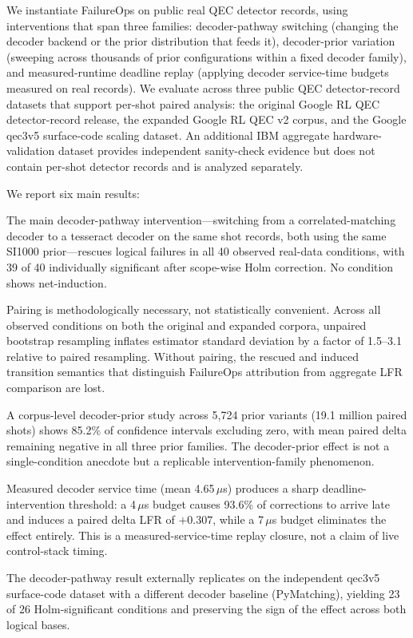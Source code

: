 We instantiate FailureOps on public real QEC detector records, using interventions that span three families: decoder-pathway switching (changing the decoder backend or the prior distribution that feeds it), decoder-prior variation (sweeping across thousands of prior configurations within a fixed decoder family), and measured-runtime deadline replay (applying decoder service-time budgets measured on real records). We evaluate across three public QEC detector-record datasets that support per-shot paired analysis: the original Google RL QEC detector-record release, the expanded Google RL QEC v2 corpus, and the Google qec3v5 surface-code scaling dataset. An additional IBM aggregate hardware-validation dataset provides independent sanity-check evidence but does not contain per-shot detector records and is analyzed separately.

We report six main results:

The main decoder-pathway intervention---switching from a correlated-matching decoder to a tesseract decoder on the same shot records, both using the same SI1000 prior---rescues logical failures in all 40 observed real-data conditions, with 39 of 40 individually significant after scope-wise Holm correction. No condition shows net-induction.

Pairing is methodologically necessary, not statistically convenient. Across all observed conditions on both the original and expanded corpora, unpaired bootstrap resampling inflates estimator standard deviation by a factor of 1.5--3.1 relative to paired resampling. Without pairing, the rescued and induced transition semantics that distinguish FailureOps attribution from aggregate LFR comparison are lost.

A corpus-level decoder-prior study across 5,724 prior variants (19.1 million paired shots) shows 85.2\% of confidence intervals excluding zero, with mean paired delta remaining negative in all three prior families. The decoder-prior effect is not a single-condition anecdote but a replicable intervention-family phenomenon.

Measured decoder service time (mean 4.65\,$\mu$s) produces a sharp deadline-intervention threshold: a 4\,$\mu$s budget causes 93.6\% of corrections to arrive late and induces a paired delta LFR of $+0.307$, while a 7\,$\mu$s budget eliminates the effect entirely. This is a measured-service-time replay closure, not a claim of live control-stack timing.

The decoder-pathway result externally replicates on the independent qec3v5 surface-code dataset with a different decoder baseline (PyMatching), yielding 23 of 26 Holm-significant conditions and preserving the sign of the effect across both logical bases.

